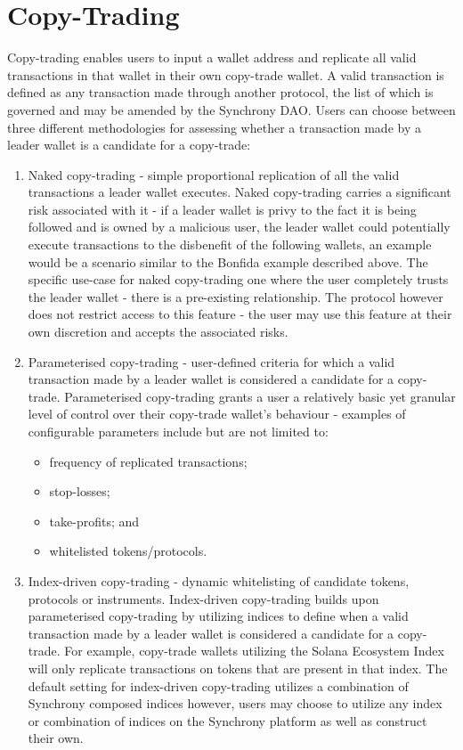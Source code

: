 \documentclass[10pt]{article}
\begin{document}
					\section{Copy-Trading}
					Copy-trading enables users to input a wallet address and replicate all valid
					transactions in that wallet in their own copy-trade wallet. A valid transaction
					is defined as any transaction made through another protocol, the list of which
					is governed and may be amended by the Synchrony DAO. Users can choose between
					three different methodologies for assessing whether a transaction made by
					a leader wallet is a candidate for a copy-trade:
					\begin{enumerate}
						\item Naked copy-trading - simple proportional replication of all the valid
							transactions a leader wallet executes. Naked copy-trading carries
							a significant risk associated with it - if a leader wallet is privy to
							the fact it is being followed and is owned by a malicious user, the
							leader wallet could potentially execute transactions to the disbenefit
							of the following wallets, an example would be a scenario similar to the
							Bonfida example described above. The specific use-case for naked
							copy-trading one where the user completely trusts the leader wallet
							- there is a pre-existing relationship. The protocol however does not
							restrict access to this feature - the user may use this feature at their
							own discretion and accepts the associated risks.
						\item Parameterised copy-trading - user-defined criteria for which
							a valid transaction made by a leader wallet is considered
							a candidate for a copy-trade. Parameterised copy-trading grants
							a user a relatively basic yet granular level of control over their
							copy-trade wallet's behaviour - examples of configurable parameters 
							include but are not limited to:
							\begin{itemize}
								\item frequency of replicated transactions;
								\item stop-losses;
								\item take-profits; and
								\item whitelisted tokens/protocols.
							\end{itemize}
						\item Index-driven copy-trading - dynamic whitelisting of candidate tokens,
							protocols or instruments. Index-driven copy-trading builds upon
							parameterised copy-trading by utilizing indices to define when a valid
							transaction made by a leader wallet is considered a candidate for
							a copy-trade. For example, copy-trade wallets utilizing the Solana
							Ecosystem Index will only replicate transactions on tokens that are
							present in that index. The default setting for index-driven copy-trading
							utilizes a combination of Synchrony composed indices however, users may
							choose to utilize any index or combination of indices on the Synchrony
							platform as well as construct their own.
					\end{enumerate}
\end{document}
